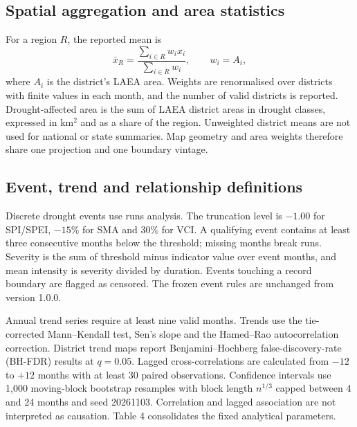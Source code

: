 \documentclass[11pt,a4paper]{article}
\begin{document}
\subsection*{Spatial aggregation and area statistics}
For a region $R$, the reported mean is
\[
\bar{x}_R=\frac{\sum_{i\in R} w_i x_i}{\sum_{i\in R} w_i},\qquad w_i=A_i,
\]
where $A_i$ is the district's LAEA area. Weights are renormalised over districts with finite values in each month, and the number of valid districts is reported. Drought-affected area is the sum of LAEA district areas in drought classes, expressed in km$^2$ and as a share of the region. Unweighted district means are not used for national or state summaries. Map geometry and area weights therefore share one projection and one boundary vintage.

\subsection*{Event, trend and relationship definitions}
Discrete drought events use runs analysis\citep{Yevjevich1967}. The truncation level is $-1.00$ for SPI/SPEI, $-15$\% for SMA and 30\% for VCI. A qualifying event contains at least three consecutive months below the threshold; missing months break runs. Severity is the sum of threshold minus indicator value over event months, and mean intensity is severity divided by duration. Events touching a record boundary are flagged as censored. The frozen event rules are unchanged from version 1.0.0.

Annual trend series require at least nine valid months. Trends use the tie-corrected Mann--Kendall test\citep{Mann1945}, Sen's slope\citep{Sen1968} and the Hamed--Rao autocorrelation correction\citep{HamedRao1998}. District trend maps report Benjamini--Hochberg false-discovery-rate (BH-FDR) results at $q=0.05$\citep{BenjaminiHochberg1995}. Lagged cross-correlations are calculated from $-12$ to $+12$ months with at least 30 paired observations. Confidence intervals use 1,000 moving-block bootstrap resamples with block length $n^{1/3}$ capped between 4 and 24 months and seed 20261103\citep{Kunsch1989}. Correlation and lagged association are not interpreted as causation. Table 4 consolidates the fixed analytical parameters.
\end{document}
